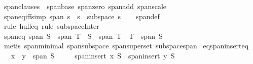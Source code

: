 \begin{isabellebody}
\ span{\isacharunderscore}{\kern0pt}clauses\ {\isacharequal}{\kern0pt}\ span{\isacharunderscore}{\kern0pt}base\ span{\isacharunderscore}{\kern0pt}zero\ span{\isacharunderscore}{\kern0pt}add\ span{\isacharunderscore}{\kern0pt}scale\isanewline
\isanewline
{}\isamarkupfalse%
\ span{\isacharunderscore}{\kern0pt}eq{\isacharunderscore}{\kern0pt}iff{\isacharbrackleft}{\kern0pt}simp{\isacharbrackright}{\kern0pt}{\isacharcolon}{\kern0pt}\ {\isachardoublequoteopen}span\ s\ {\isacharequal}{\kern0pt}\ s\ {\isasymlongleftrightarrow}\ subspace\ s{\isachardoublequoteclose}\isanewline
%
\isadelimproof
\ \ %
\endisadelimproof
%
\isatagproof
{}\isamarkupfalse%
\ span{\isacharunderscore}{\kern0pt}def\ \isamarkupfalse%
\ {\isacharparenleft}{\kern0pt}rule\ hull{\isacharunderscore}{\kern0pt}eq{\isacharparenright}{\kern0pt}\ {\isacharparenleft}{\kern0pt}rule\ subspace{\isacharunderscore}{\kern0pt}Inter{\isacharparenright}{\kern0pt}%
\endisatagproof
{\isafoldproof}%
%
\isadelimproof
\isanewline
%
\endisadelimproof
\isanewline
{}\isamarkupfalse%
\ span{\isacharunderscore}{\kern0pt}eq{\isacharcolon}{\kern0pt}\ {\isachardoublequoteopen}span\ S\ {\isacharequal}{\kern0pt}\ span\ T\ {\isasymlongleftrightarrow}\ S\ {\isasymsubseteq}\ span\ T\ {\isasymand}\ T\ {\isasymsubseteq}\ span\ S{\isachardoublequoteclose}\isanewline
%
\isadelimproof
\ \ %
\endisadelimproof
%
\isatagproof
{}\isamarkupfalse%
\ {\isacharparenleft}{\kern0pt}metis\ span{\isacharunderscore}{\kern0pt}minimal\ span{\isacharunderscore}{\kern0pt}subspace\ span{\isacharunderscore}{\kern0pt}superset\ subspace{\isacharunderscore}{\kern0pt}span{\isacharparenright}{\kern0pt}%
\endisatagproof
{\isafoldproof}%
%
\isadelimproof
\isanewline
%
\endisadelimproof
\isanewline
{}\isamarkupfalse%
\ eq{\isacharunderscore}{\kern0pt}span{\isacharunderscore}{\kern0pt}insert{\isacharunderscore}{\kern0pt}eq{\isacharcolon}{\kern0pt}\isanewline
\ \ \ {\isachardoublequoteopen}{\isacharparenleft}{\kern0pt}x\ {\isacharminus}{\kern0pt}\ y{\isacharparenright}{\kern0pt}\ {\isasymin}\ span\ S{\isachardoublequoteclose}\isanewline
\ \ \ \ \ {\isachardoublequoteopen}span{\isacharparenleft}{\kern0pt}insert\ x\ S{\isacharparenright}{\kern0pt}\ {\isacharequal}{\kern0pt}\ span{\isacharparenleft}{\kern0pt}insert\ y\ S{\isacharparenright}{\kern0pt}{\isachardoublequoteclose}\isanewline
%
\isadelimproof
%
\endisadelimproof
%
\isatagproof
{}\isamarkupfalse%
\ {\isacharminus}{\kern0pt}\isanewline
\ \ \isamarkupfalse%

\end{isabellebody}
